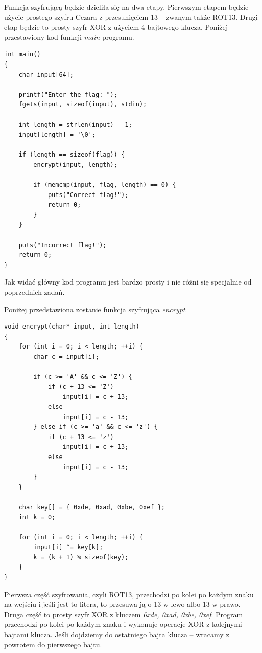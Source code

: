 \documentclass[polish,12pt]{aghthesis}
\begin{document}
Funkcja szyfrującą będzie dzieliła się na dwa etapy. Pierwszym etapem będzie użycie prostego
szyfru Cezara z przesunięciem 13 -- zwanym także ROT13. Drugi etap będzie to prosty szyfr XOR
z użyciem 4 bajtowego klucza. Poniżej przestawiony kod funkcji \emph{main} programu.

\begin{verbatim}
int main()
{
    char input[64];

    printf("Enter the flag: ");
    fgets(input, sizeof(input), stdin);

    int length = strlen(input) - 1;
    input[length] = '\0';

    if (length == sizeof(flag)) {
        encrypt(input, length);

        if (memcmp(input, flag, length) == 0) {
            puts("Correct flag!");
            return 0;
        }
    }

    puts("Incorrect flag!");
    return 0;
}
\end{verbatim}

Jak widać główny kod programu jest bardzo prosty i nie różni się specjalnie od poprzednich zadań.
\clearpage

Poniżej przedstawiona zostanie funkcja szyfrująca \emph{encrypt}.

\begin{verbatim}
void encrypt(char* input, int length)
{
    for (int i = 0; i < length; ++i) {
        char c = input[i];

        if (c >= 'A' && c <= 'Z') {
            if (c + 13 <= 'Z')
                input[i] = c + 13;
            else
                input[i] = c - 13;
        } else if (c >= 'a' && c <= 'z') {
            if (c + 13 <= 'z')
                input[i] = c + 13;
            else
                input[i] = c - 13;
        }
    }

    char key[] = { 0xde, 0xad, 0xbe, 0xef };
    int k = 0;

    for (int i = 0; i < length; ++i) {
        input[i] ^= key[k];
        k = (k + 1) % sizeof(key);
    }
}
\end{verbatim}

Pierwsza część szyfrowania, czyli ROT13, przechodzi po kolei po każdym znaku na wejściu i jeśli jest to litera,
to przesuwa ją o 13 w lewo albo 13 w prawo. Druga część to prosty szyfr XOR z kluczem \emph{0xde, 0xad, 0xbe, 0xef}.
Program przechodzi po kolei po każdym znaku i wykonuje operacje XOR z kolejnymi bajtami klucza. Jeśli dojdziemy
do ostatniego bajta klucza -- wracamy z powrotem do pierwszego bajtu.
\end{document}
